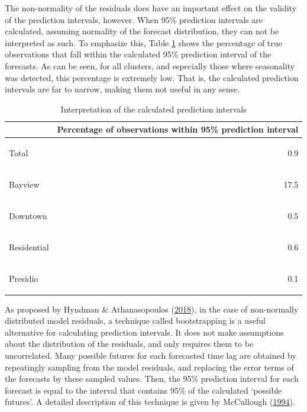 \documentclass[12pt,oneside]{reedthesis}
\begin{document}
The non-normality of the residuals does have an important effect on the
validity of the prediction intervals, however. When 95\% prediction
intervals are calculated, assuming normality of the forecast
distribution, they can not be interpreted as such. To emphasize this,
Table \ref{tab:intervalcheck} shows the percentage of true observations
that fall within the calculated 95\% prediction interval of the
forecasts. As can be seen, for all clusters, and especially those where
seasonality was detected, this percentage is extremely low. That is, the
calculated prediction intervals are far to narrow, making them not
useful in any sense.
\begin{table}[H]

\caption{\label{tab:intervalcheck}Interpretation of the calculated prediction intervals}
\centering
\begin{tabular}{>{\bfseries\raggedright\arraybackslash}p{4cm}r}
\toprule
  & Percentage of observations within 95\% prediction interval\\
\midrule
\rowcolor{gray!6}  Total & 0.9\\
Bayview & 17.5\\
\rowcolor{gray!6}  Downtown & 0.5\\
Residential & 0.6\\
\rowcolor{gray!6}  Presidio & 0.1\\
\bottomrule
\end{tabular}
\end{table}
As proposed by Hyndman \& Athanasopoulos
(\protect\hyperlink{ref-hyndman2018fpp}{2018}), in the case of
non-normally distributed model residuals, a technique called
bootstrapping is a useful alternative for calculating prediction
intervals. It does not make assumptions about the distribution of the
residuals, and only requires them to be uncorrelated. Many possible
futures for each forecasted time lag are obtained by repeatingly
sampling from the model residuals, and replacing the error terms of the
forecasts by these sampled values. Then, the 95\% prediction interval
for each forecast is equal to the interval that contains 95\% of the
calculated `possible futures'. A detailed description of this technique
is given by McCullough (\protect\hyperlink{ref-mccullough1994}{1994}).
\end{document}
